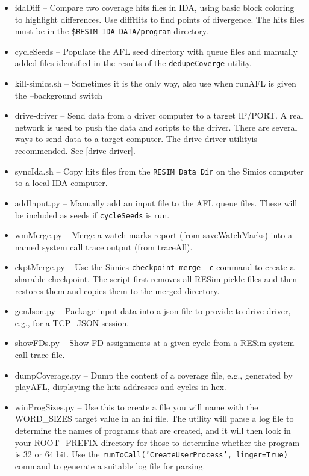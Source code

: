 \documentclass[titlepage]{article}
\begin{document}
\begin{itemize}
\item idaDiff -- Compare two coverage hits files in IDA, using basic block coloring to highlight differences.  Use diffHits to find points
of divergence.  The hits files must be in the {\tt \$RESIM\_IDA\_DATA/program} directory.
\item cycleSeeds -- Populate the AFL seed directory with queue files and manually added files identified in the results of the {\tt dedupeCoverge} utility.
\item kill-simics.sh -- Sometimes it is the only way, also use when runAFL is given the --background switch
\item drive-driver -- Send data from a driver computer to a target IP/PORT.  A real network is used to push the data and scripts
to the driver.  There are several ways to send data to a target computer. The drive-driver utilityis recommended.  See \ref{drive-driver}.
\item syncIda.sh -- Copy hits files from the {\tt RESIM\_Data\_Dir} on the Simics computer to a local IDA computer.
\item addInput.py  -- Manually add an input file to the AFL queue files.  These will be included as seeds if {\tt cycleSeeds} is run.
\item wmMerge.py -- Merge a watch marks report (from saveWatchMarks) into a named system call trace output (from traceAll).
\item ckptMerge.py -- Use the Simics {\tt checkpoint-merge -c} command to create a sharable checkpoint.  The script first removes all RESim pickle files and
then restores them and copies them to the merged directory.
\item genJson.py -- Package input data into a json file to provide to drive-driver, e.g., for a TCP\_JSON session.
\item showFDs.py -- Show FD assignments at a given cycle from a RESim system call trace file.
\item dumpCoverage.py -- Dump the content of a coverage file, e.g., generated by playAFL, displaying the hits addresses and cycles in hex.
\item winProgSizes.py -- Use this to create a file you will name with the WORD\_SIZES target value in an ini file.  The utility will parse a log file 
to determine the names of programs that are created, and it will then look in your ROOT\_PREFIX directory for those to determine whether the program is 32 or
64 bit.  Use the {\tt runToCall('CreateUserProcess', linger=True)} command to generate a suitable log file for parsing.

\end{itemize}
\end{document}
